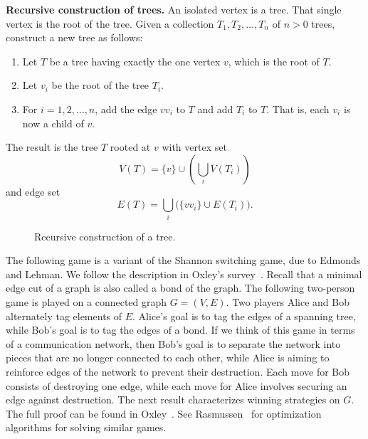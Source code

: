 \begin{theorem}
\label{thm:trees_forests:recursive_construction_trees}
\textbf{Recursive construction of trees.}
An isolated vertex is a tree. That single
vertex is the root of the tree. Given a collection
$T_1, T_2, \dots, T_n$ of $n > 0$ trees, construct a new tree as
follows:
\begin{enumerate}
\item Let $T$ be a tree having exactly the one vertex $v$, which is
  the root of $T$.

\item Let $v_i$ be the root of the tree $T_i$.

\item For $i = 1, 2, \dots, n$, add the edge $v v_i$ to $T$ and add
  $T_i$ to $T$. That is, each $v_i$ is now a child of $v$.
\end{enumerate}
The result is the tree $T$ rooted at $v$ with vertex set
\[
V(T)
=
\{v\} \cup \left(\bigcup_i V(T_i)\right)
\]
and edge set
\[
E(T)
=
\bigcup_i \big(\{v v_i\} \cup E(T_i)\big).
\]
\end{theorem}

\begin{figure}[!htbp]
\centering
{}

\caption{Recursive construction of a tree.}
\label{fig:trees_forests:recursive_construction_tree}
\end{figure}

The following game is a variant of the Shannon
switching game, due to
Edmonds and
Lehman. We follow the
description in Oxley's
survey~\cite{Oxley2003}. Recall that a minimal edge
cut of a graph is also called a bond of the graph. The
following two-person game is played on a
connected graph $G = (V,E)$. Two players Alice
and Bob alternately tag elements of $E$. Alice's goal is to tag the
edges of a spanning tree, while Bob's goal is to
tag the edges of a bond. If we think of this game in terms
of a communication network, then Bob's
goal is to separate the network into pieces that are no longer
connected to each other, while Alice is aiming to reinforce edges of
the network to prevent their destruction. Each move for Bob consists
of destroying one edge, while each move for Alice involves securing an
edge against destruction. The next result characterizes winning
strategies on $G$. The full proof can be found in
Oxley~\cite{Oxley2003}. See
Rasmussen~\cite{Rasmussen2007} for
optimization algorithms for solving
similar games.

